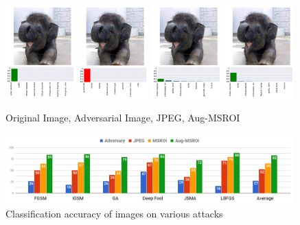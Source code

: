 \begin{figure}[H]
   \centering
     \includegraphics[width=0.24\textwidth,angle=0]{figures/protect/ori.pdf}
     \includegraphics[width=0.24\textwidth,angle=0]{figures/protect/adv.pdf}
     \includegraphics[width=0.24\textwidth,angle=0]{figures/protect/jpg.pdf}
     \includegraphics[width=0.24\textwidth,angle=0]{figures/protect/msroi.pdf}
              \caption[Augmented Multi-Structure ROI]{Original Image, Adversarial Image, JPEG, Aug-MSROI }
     \label{fig:compare}
 \end{figure}
 
 
 \begin{figure}[H]
     \centering
     \includegraphics[width=0.99\textwidth,angle=0]{figures/protect/results.png}
     \caption[Classification accuracy of images on various attacks]{Classification accuracy of images on various attacks}
     \label{fig:numbers}
     \end{figure}

